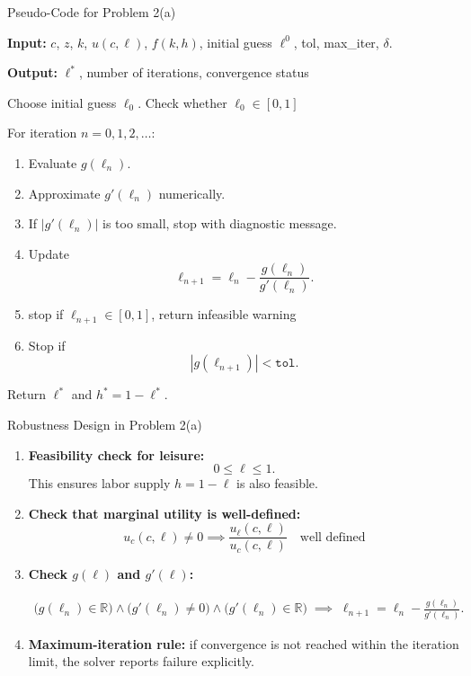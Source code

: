 \documentclass[9pt]{beamer}
\begin{document}
\begin{frame}{Pseudo-Code for Problem 2(a)}
\small

\textbf{Input:} $c$, $z$, $k$, $u(c,\ell)$, $f(k,h)$, initial guess $\ell^0$, tol, max\_iter, $\delta$.

\textbf{Output:} $\ell^*$, number of iterations, convergence status


Choose initial guess $\ell_0$. Check whether $\ell_0 \in [0,1]$

For iteration $n=0,1,2,\dots$:
\begin{enumerate}
    \item Evaluate $g(\ell_n)$.
    \item Approximate $g'(\ell_n)$ numerically.
    \item If $|g'(\ell_n)|$ is too small, stop with diagnostic message.
    \item Update
    \[
    \ell_{n+1}=\ell_n-\frac{g(\ell_n)}{g'(\ell_n)}.
    \]
    \item stop if $\ell_{n+1} \in [0,1]$, return infeasible warning
    \item Stop if
    \[
    |g(\ell_{n+1})|<\texttt{tol}.
    \]
\end{enumerate}
Return $\ell^*$ and $h^*=1-\ell^*$.

\end{frame}

\begin{frame}{Robustness Design in Problem 2(a)}

\begin{enumerate}
    \item \textbf{Feasibility check for leisure:}
    \[
    0 \le \ell \le 1.
    \]
    This ensures labor supply $h=1-\ell$ is also feasible.

    \item \textbf{Check that marginal utility is well-defined:}
    \[
    u_c(c,\ell) \neq 0 \implies \frac{u_{\ell}(c,\ell)}{u_c(c,\ell)} \quad \text{well defined}
    \]

    \item \textbf{Check $g(\ell)$ and $g'(\ell)$:}

    \begin{align*}
        \bigl(g(\ell_n)\in\mathbb{R}\bigr)\land\bigl(g'(\ell_n)\neq 0\bigr)\land\bigl(g'(\ell_n)\in\mathbb{R}\bigr)
        \;\implies\;
        \ell_{n+1}=\ell_n-\frac{g(\ell_n)}{g'(\ell_n)}.
    \end{align*}

    \item \textbf{Maximum-iteration rule:} if convergence is not reached within the iteration limit, the solver reports failure explicitly.
\end{enumerate}
\end{frame}
\end{document}
